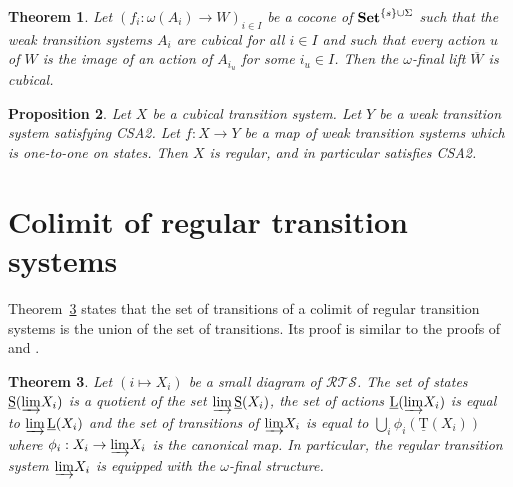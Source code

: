 \documentclass[a4paper,12pt]{amsart}
\newtheorem{thm}{Theorem}[section]
\newtheorem{prop}[thm]{Proposition}
\begin{document}
\begin{thm} \cite[Theorem~3.3]{csts} \label{cubical-lift} Let $(f_i:\omega
(A_i)\to W)_{i\in I}$ be a cocone of ${{{\rm{\mathbf{{Set}}}}}}^{\{s\}\cup \Sigma}$ such
that the weak transition systems $A_i$ are cubical for all $i\in I$
and such that every action $u$ of $W$ is the image of an action of
$A_{i_u}$ for some $i_u\in I$. Then the $\omega$-final lift
$\overline{W}$ is cubical.  \end{thm}

\begin{prop} \cite[Proposition~4.1]{csts} \label{mor-cub-reg} Let $X$ be a
cubical transition system. Let $Y$ be a weak transition system
satisfying CSA2. Let $f:X\to Y$ be a map of weak transition systems
which is one-to-one on states.  Then $X$ is regular, and in particular
satisfies CSA2.  \end{prop}

\section{Colimit of regular transition systems}
\label{section-colim}

Theorem~\ref{colim-rts} states that the set of transitions of a
colimit of regular transition systems is the union of the set of
transitions. Its proof is similar to the proofs of
\cite[Theorem~4.7]{hdts} and \cite[Proposition~A.3]{csts}. 

\begin{thm} \label{colim-rts} Let $(i\mapsto X_i)$ be a small diagram of
${\mathcal{R\!T\!S}}$. The set of states $\operatorname{\underline{S}}({\varinjlim} X_i)$ is a quotient of the set
${\varinjlim} \operatorname{\underline{S}}(X_i)$, the set of actions $\operatorname{\underline{L}}({\varinjlim} X_i)$ is equal to
${\varinjlim} \operatorname{\underline{L}}(X_i)$ and the set of transitions of ${\varinjlim} X_i$ is
equal to $\bigcup_i \phi_i(\operatorname{\underline{T}}(X_i))$ where $\phi_i:X_i \to {\varinjlim}
X_i$ is the canonical map. In particular, the regular transition
system ${\varinjlim} X_i$ is equipped with the $\omega$-final structure.
\end{thm}
\end{document}
